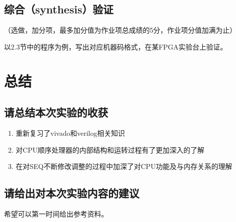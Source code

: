 \subsection{综合（synthesis）验证}
\begin{center}
    （选做，加分项，最多加分值为作业项总成绩的5分，作业项分值加满为止）
\end{center}

以2.3节中的程序为例，写出对应机器码格式，在某FPGA实验台上验证。

\section{总结}
\subsection{请总结本次实验的收获}
\begin{enumerate}
    \item 重新复习了vivado和verilog相关知识
    \item 对CPU顺序处理器的内部结构和运转过程有了更加深入的了解
    \item 在对SEQ不断修改调整的过程中加深了对CPU功能及与内存关系的理解
\end{enumerate}

\subsection{请给出对本次实验内容的建议}
希望可以第一时间给出参考资料。